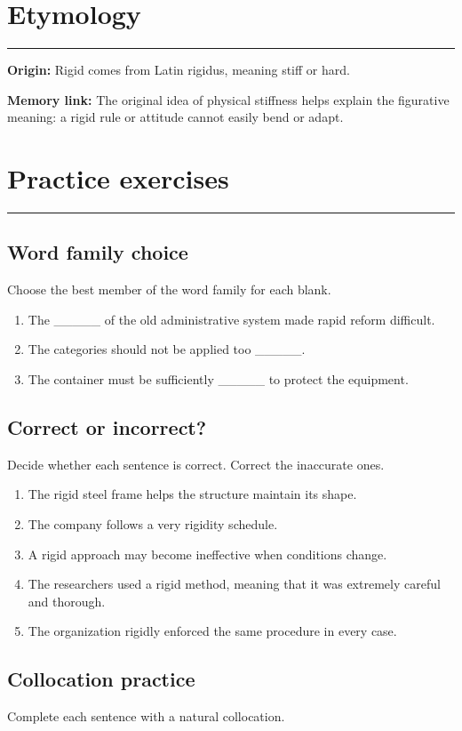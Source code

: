 \documentclass[11pt]{article}
\newcommand{\sectionrule}{\par\vspace{-0.5em}\noindent\textcolor{Accent}{\rule{\linewidth}{0.6pt}}\par}
\begin{document}
\section{Etymology}
\sectionrule
\textbf{Origin:} Rigid comes from Latin rigidus, meaning stiff or hard.

\textbf{Memory link:} The original idea of physical stiffness helps explain the figurative meaning: a rigid rule or attitude cannot easily bend or adapt.

\section{Practice exercises}
\sectionrule
\subsection{Word family choice}
Choose the best member of the word family for each blank.

\begin{enumerate}
  \item The \_\_\_\_\_ of the old administrative system made rapid reform difficult.
  \item The categories should not be applied too \_\_\_\_\_.
  \item The container must be sufficiently \_\_\_\_\_ to protect the equipment.
\end{enumerate}

\subsection{Correct or incorrect?}
Decide whether each sentence is correct. Correct the inaccurate ones.

\begin{enumerate}
  \item The rigid steel frame helps the structure maintain its shape.
  \item The company follows a very rigidity schedule.
  \item A rigid approach may become ineffective when conditions change.
  \item The researchers used a rigid method, meaning that it was extremely careful and thorough.
  \item The organization rigidly enforced the same procedure in every case.
\end{enumerate}

\subsection{Collocation practice}
Complete each sentence with a natural collocation.
\end{document}
